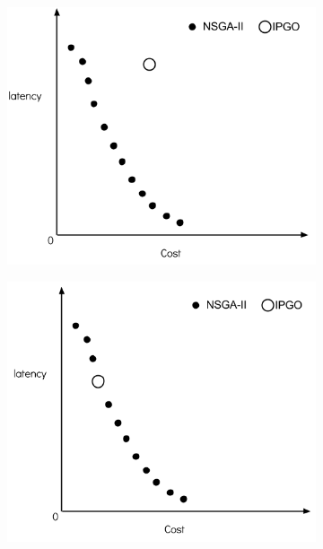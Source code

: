 \documentclass{llncs}
\begin{document}
\begin{figure}[H]
	\centering
	\begin{subfigure}[b]{0.49\textwidth}
		\includegraphics[width=\textwidth]{pics/1.png}
		\caption{}
	\end{subfigure}
	\begin{subfigure}[b]{0.49\textwidth}
		\includegraphics[width=\textwidth]{pics/2.png}
		\caption{}
	\end{subfigure}



\end{figure}
\end{document}
